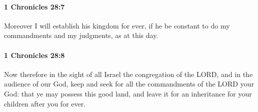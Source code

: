 		\paragraph{1 Chronicles 28:7} %
			\label{1CHRONICLES-28-7}

			Moreover I will establish his kingdom for ever, if he be constant to do my commandments and my judgments, as at this day.


		\paragraph{1 Chronicles 28:8} %
			\label{1CHRONICLES-28-8}

			Now therefore in the sight of all Israel the congregation of the LORD, and in the audience of our God, keep and seek for all the commandments of the LORD your God: that ye may possess this good land, and leave it for an inheritance for your children after you for ever.

